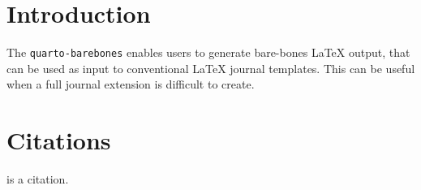 \makeatletter
{}
\newcommand{\tightlist}
\makeatother
\author{}
\date{}
\section{Introduction}\label{introduction}

The \texttt{quarto-barebones} enables users to generate bare-bones
{\LaTeX} output, that can be used as input to conventional {\LaTeX}
journal templates. This can be useful when a full journal extension is
difficult to create.

\section{Citations}\label{citations}

\citet{CameronTrivedi2013} is a citation.

